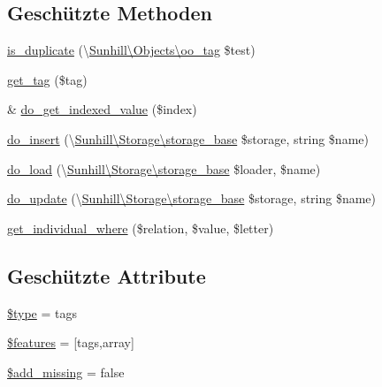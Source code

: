 \subsection*{Geschützte Methoden}
\begin{DoxyCompactItemize}
\item 
\hyperlink{classSunhill_1_1Properties_1_1oo__property__tags_a7bcb02809f3d490c0f51dda09b2ae9ea}{is\+\_\+duplicate} (\textbackslash{}\hyperlink{classSunhill_1_1Objects_1_1oo__tag}{Sunhill\textbackslash{}\+Objects\textbackslash{}oo\+\_\+tag} \$test)
\item 
\hyperlink{classSunhill_1_1Properties_1_1oo__property__tags_a9683501aa69bc9b308328dcd705318ba}{get\+\_\+tag} (\$tag)
\item 
\& \hyperlink{classSunhill_1_1Properties_1_1oo__property__tags_a8aaa1e57967451708047a2fcb041382c}{do\+\_\+get\+\_\+indexed\+\_\+value} (\$index)
\item 
\hyperlink{classSunhill_1_1Properties_1_1oo__property__tags_aebc7f1494379d528f9e88988ce9a095e}{do\+\_\+insert} (\textbackslash{}\hyperlink{classSunhill_1_1Storage_1_1storage__base}{Sunhill\textbackslash{}\+Storage\textbackslash{}storage\+\_\+base} \$storage, string \$name)
\item 
\hyperlink{classSunhill_1_1Properties_1_1oo__property__tags_a350faf7d9c9c8c54164d299ee75f4f89}{do\+\_\+load} (\textbackslash{}\hyperlink{classSunhill_1_1Storage_1_1storage__base}{Sunhill\textbackslash{}\+Storage\textbackslash{}storage\+\_\+base} \$loader, \$name)
\item 
\hyperlink{classSunhill_1_1Properties_1_1oo__property__tags_a04a2ba2306ba4d83d4ccbadcc224e546}{do\+\_\+update} (\textbackslash{}\hyperlink{classSunhill_1_1Storage_1_1storage__base}{Sunhill\textbackslash{}\+Storage\textbackslash{}storage\+\_\+base} \$storage, string \$name)
\item 
\hyperlink{classSunhill_1_1Properties_1_1oo__property__tags_ac83ba13a23bbcdd46244706b9e74471d}{get\+\_\+individual\+\_\+where} (\$relation, \$value, \$letter)
\end{DoxyCompactItemize}
\subsection*{Geschützte Attribute}
\begin{DoxyCompactItemize}
\item 
\hyperlink{classSunhill_1_1Properties_1_1oo__property__tags_a5d6c244a93ed04c907869b6c0f0a715b}{\$type} = \textquotesingle{}tags\textquotesingle{}
\item 
\hyperlink{classSunhill_1_1Properties_1_1oo__property__tags_ab83d8a8d7da80cd46f8593cce489f9d2}{\$features} = \mbox{[}\textquotesingle{}tags\textquotesingle{},\textquotesingle{}array\textquotesingle{}\mbox{]}
\item 
\hyperlink{classSunhill_1_1Properties_1_1oo__property__tags_aeee4c63c0afc01d33ec4ec3c1ecfce7f}{\$add\+\_\+missing} = false
\end{DoxyCompactItemize}


